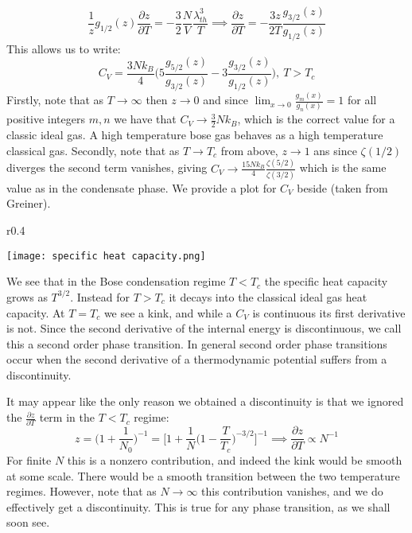\documentclass[a4paper,11pt,oneside]{book}
\begin{document}
\begin{equation}
    \frac{1}{z}g_{1/2}(z)\frac{\partial z}{\partial T} = -\frac{3}{2}\frac{N}{V}\frac{\lambda_{th}^3}{T}
    \implies \frac{\partial z}{\partial T}  = - \frac{3z}{2T}\frac{g_{3/2}(z)}{g_{1/2}(z)}
\end{equation}
This allows us to write:
\begin{equation}\label{specific heat high}
    \boxed{C_V = \frac{3Nk_B}{4}\bigg(5\frac{g_{5/2}(z)}{g_{3/2}(z)}-3\frac{g_{3/2}(z)}{g_{1/2}(z)}\bigg), \ T>T_c}
\end{equation}
Firstly, note that as $T \rightarrow \infty$ then $z \rightarrow 0$ and since $\lim_{x \rightarrow 0}\frac{g_{m}(x)}{g_n(x)} = 1$ for all positive integers $m,n$ we have that $C_V \rightarrow \frac{3}{2}Nk_B$, which is the correct value for a classic ideal gas. A high temperature bose gas behaves as a high temperature classical gas. Secondly, note that as $T \rightarrow T_c$ from above, $z \rightarrow 1$ ans since $\zeta(1/2)$ diverges the second term vanishes, giving $C_V \rightarrow \frac{15Nk_B}{4}\frac{\zeta(5/2)}{\zeta(3/2)}$ which is the same value as in the condensate phase. We provide a plot for $C_V$ beside (taken from Greiner).
\begin{wrapfigure}{r}{0.4\textwidth}
  \begin{center}
    \texttt{[image: specific heat capacity.png]}
  \end{center}
\end{wrapfigure}
We see that in the Bose condensation regime $T<T_c$ the specific heat capacity grows as $T^{3/2}$. Instead for $T>T_c$ it decays into the classical ideal gas heat capacity. At $T=T_c$ we see a kink, and while a $C_V$ is continuous its first derivative is not. Since the second derivative of the internal energy is discontinuous, we call this a second order phase transition. In general second order phase transitions occur when the second derivative of a thermodynamic potential suffers from a discontinuity.

It may appear like the only reason we obtained a discontinuity is that we ignored the $\frac{\partial z}{\partial T}$ term in the $T<T_c$ regime:
\begin{equation}
    z=\bigg(1+\frac{1}{N_0}\bigg)^{-1} = \bigg[1+\frac{1}{N}\bigg(1-\frac{T}{T_c}\bigg)^{-3/2}\bigg]^{-1}\implies \frac{\partial z}{\partial T} \propto N^{-1}
\end{equation}
For finite $N$ this is a nonzero contribution, and indeed the kink would be smooth at some scale. There would be a smooth transition between the two temperature regimes. However, note that as $N \rightarrow \infty$ this contribution vanishes, and we do effectively get a discontinuity. This is true for any phase transition, as we shall soon see.
\end{document}
